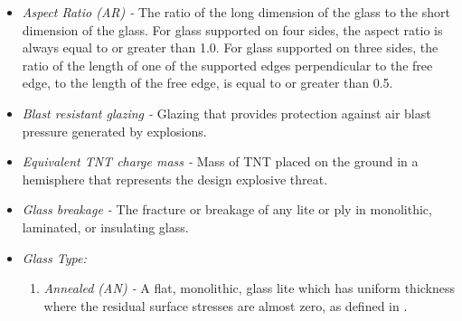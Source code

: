 \documentclass[12pt]{article}
\begin{document}
\begin{itemize}
\item \textit{Aspect Ratio (AR) -} The ratio of the long dimension of the
  glass to the short dimension of the glass.  For glass supported on four sides,
  the aspect ratio is always equal to or greater than 1.0. For glass supported
  on three sides, the ratio of the length of one of the supported edges
  perpendicular to the free edge, to the length of the free edge, is equal to or
  greater than 0.5.
  
\item \textit{Blast resistant glazing -} Glazing that provides protection 
against air blast pressure generated by explosions.

\item \textit{Equivalent TNT charge mass -} Mass of TNT placed on the ground in 
a hemisphere that represents the design explosive threat. 

\item \textit{Glass breakage -} The fracture or breakage of any lite or ply in
monolithic, laminated, or insulating glass.   
  
\item \textit{Glass Type:}
\begin{enumerate}

\item \textit{Annealed (AN) -} A flat, monolithic, glass lite which has uniform 
thickness where the residual surface stresses are almost zero, as defined in 
\cite{ASTM2016}.


\end{enumerate}
\end{itemize}
\end{document}
